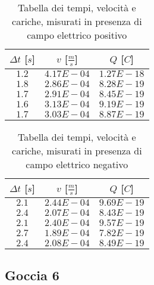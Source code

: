 \documentclass{article}
\begin{document}
\begin{multicols}{2}

\begin{table}[H]
	\centering
	\begin{tabular}{| c | c | c |}
		\hline
		$\Delta t$ [$s$] & $v$ [$\frac ms$] & $Q$ [$C$] \\
		\hline
		$1.2$ & $4.17E-04$ & $1.27E-18$ \\
		$1.8$ & $2.86E-04$ & $8.28E-19$ \\
		$1.7$ & $2.91E-04$ & $8.45E-19$ \\
		$1.6$ & $3.13E-04$ & $9.19E-19$ \\
		$1.7$ & $3.03E-04$ & $8.87E-19$ \\
		\hline
	\end{tabular}
	\caption{Tabella dei tempi, velocità e cariche, misurati in presenza di campo elettrico positivo}
	\label{}
\end{table}

\columnbreak

\begin{table}[H]
	\centering
	\begin{tabular}{| c | c | c |}
		\hline
		$\Delta t$ [$s$] & $v$ [$\frac ms$] & $Q$ [$C$] \\
		\hline
		$2.1$ & $2.44E-04$ & $9.69E-19$ \\
		$2.4$ & $2.07E-04$ & $8.43E-19$ \\
		$2.1$ & $2.40E-04$ & $9.57E-19$ \\
		$2.7$ & $1.89E-04$ & $7.82E-19$ \\
		$2.4$ & $2.08E-04$ & $8.49E-19$ \\
		\hline		
	\end{tabular}
	\caption{Tabella dei tempi, velocità e cariche, misurati in presenza di campo elettrico negativo}
	\label{}
\end{table}
	
\end{multicols}

\subsection{Goccia 6}
\end{document}
